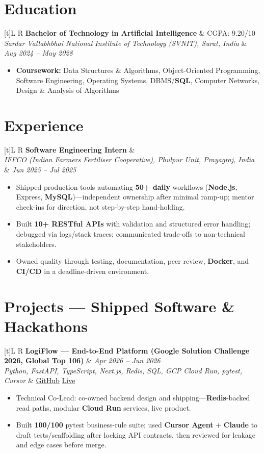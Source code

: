 \documentclass[a4paper,10pt]{article}
\newcommand{\resumeSubheading}[4]{%
  \vspace{0.3mm}
  \noindent
  \begin{tabularx}{\textwidth}[t]{L R}
    \textbf{#1} & #4 \\
    \textit{#3} & \textit{#2} \\
  \end{tabularx}
  \vspace{-0.3mm}%
}
\newcommand{\resumeProject}[4]{%
  \vspace{0.3mm}
  \noindent
  \begin{tabularx}{\textwidth}[t]{L R}
    \textbf{#1} & \textit{#3} \\
    \textit{#2} & #4 \\
  \end{tabularx}
  \vspace{-0.3mm}%
}
\begin{document}
\section{Education}
\small
\resumeSubheading
  {Bachelor of Technology in Artificial Intelligence}{Aug 2024 -- May 2028}
  {Sardar Vallabhbhai National Institute of Technology (SVNIT), Surat, India}{CGPA: 9.20/10}
\begin{itemize}
  \item \textbf{Coursework:} Data Structures \& Algorithms, Object-Oriented Programming, Software Engineering, Operating Systems, DBMS/\textbf{SQL}, Computer Networks, Design \& Analysis of Algorithms
\end{itemize}

\section{Experience}
\small
\resumeSubheading
  {Software Engineering Intern}{Jun 2025 -- Jul 2025}
  {IFFCO (Indian Farmers Fertiliser Cooperative), Phulpur Unit, Prayagraj, India}{}
\begin{itemize}
  \item Shipped production tools automating \textbf{50+ daily} workflows (\textbf{Node.js}, Express, \textbf{MySQL})---independent ownership after minimal ramp-up; mentor check-ins for direction, not step-by-step hand-holding.
  \item Built \textbf{10+ RESTful APIs} with validation and structured error handling; debugged via logs/stack traces; communicated trade-offs to non-technical stakeholders.
  \item Owned quality through testing, documentation, peer review, \textbf{Docker}, and \textbf{CI/CD} in a deadline-driven environment.
\end{itemize}

\section{Projects --- Shipped Software \& Hackathons}
\small

\resumeProject
  {LogiFlow --- End-to-End Platform (Google Solution Challenge 2026, Global Top 106)}
  {Python, FastAPI, TypeScript, Next.js, Redis, SQL, GCP Cloud Run, pytest, Cursor}
  {Apr 2026 -- Jun 2026}
  {\href{https://github.com/Ojas-Srivastava05/LogiFlow-Solution-Challenge-2026}{GitHub} \textbar{} \href{https://logi-flow-solution-challenge-2026.vercel.app}{Live}}
\begin{itemize}
  \item Technical Co-Lead: co-owned backend design and shipping---\textbf{Redis}-backed read paths, modular \textbf{Cloud Run} services, live product.
  \item Built \textbf{100/100} pytest business-rule suite; used \textbf{Cursor Agent} + \textbf{Claude} to draft tests/scaffolding after locking API contracts, then reviewed for leakage and edge cases before merge.
\end{itemize}
\end{document}
